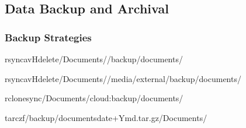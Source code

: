 \documentclass[letterpaper,10pt,english]{sphinxmanual}
\begin{document}
\subsection{Data Backup and Archival}
\label{\detokenize{data-organization:data-backup-and-archival}}

\subsubsection{Backup Strategies}
\label{\detokenize{data-organization:backup-strategies}}
\begin{sphinxVerbatim}[commandchars=\\\{\}]

rsync\PYGZhy{}avH\PYGZhy{}\PYGZhy{}delete\PYGZti{}/Documents//backup/documents/

rsync\PYGZhy{}avH\PYGZhy{}\PYGZhy{}delete\PYGZti{}/Documents//media/external/backup/documents/

rclonesync\PYGZti{}/Documents/cloud:backup/documents/

tar\PYGZhy{}czf/backup/documents\PYGZus{}date+\PYGZpc{}Y\PYGZpc{}m\PYGZpc{}d.tar.gz\PYGZti{}/Documents/
\end{sphinxVerbatim}
\end{document}
